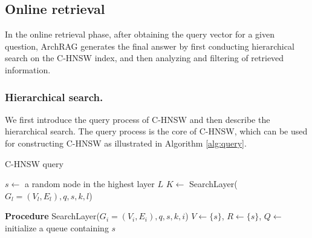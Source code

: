 \subsection{Online retrieval}


%
In the online retrieval phase, after obtaining the query vector for a given question, ArchRAG generates the final answer by first conducting hierarchical search on the C-HNSW index, and then analyzing and filtering of retrieved information.

\subsubsection{Hierarchical search.} 
\label{sec:search}
% 
We first introduce the query process of C-HNSW and then describe the hierarchical search.
%
The query process is the core of C-HNSW, which can be used for constructing C-HNSW as illustrated in Algorithm \ref{alg:query}.

\begin{algorithm}[ht]
  \caption{{C-HNSW query}}
  \label{alg:query}
  \small
    $s\gets $ a random node in the highest layer $L$\;
    $K\gets$ SearchLayer(${ G_l}=(V_l,E_l), q, s, k, l$)\;
    
    \textbf{Procedure} SearchLayer(${G_i}=(V_i,E_i), q, s,k,i$)\;
    $V\gets \{s\}$,  $R\gets \{s\}$, $Q\gets $ initialize a queue containing $s$\; 
        
\end{algorithm}


